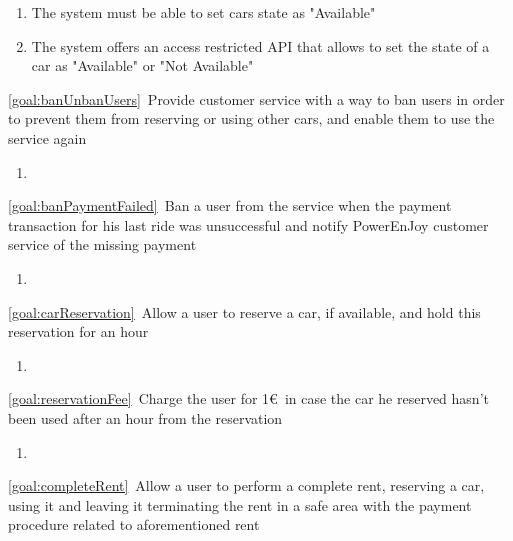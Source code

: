 \begin{description}
			\begin{enumerate}[label=\textbf{R\arabic*}]
   				\item The system must be able to set cars state as "Available"
   				\item The system offers an access restricted API that allows to set the state of a car as "Available" or
   				"Not Available"
  			\end{enumerate}
  		\item \ref{goal:banUnbanUsers}\ Provide customer service with a way to ban users in order to
  		prevent them from reserving or using other cars, and enable them to use the service again
  			\begin{enumerate}[label=\textbf{R\arabic*}]
  				\item
   			\end{enumerate}
  		\item \ref{goal:banPaymentFailed}\ Ban a user from the service when the payment transaction for his last ride
  		was unsuccessful and notify PowerEnJoy customer service of the missing payment
  			\begin{enumerate}[label=\textbf{R\arabic*}]
  				\item
  			\end{enumerate}
 	  	\item \ref{goal:carReservation}\ Allow a user to reserve a car, if available, and hold this reservation for an hour
 	  		\begin{enumerate}[label=\textbf{R\arabic*}]
 	  			\item
   			\end{enumerate}
  		\item \ref{goal:reservationFee}\ Charge the user for 1\euro\ in case the car he reserved hasn't been used after
  		an hour from the reservation
  			\begin{enumerate}[label=\textbf{R\arabic*}]
  				\item
   			\end{enumerate}
  		\item \ref{goal:completeRent}\ Allow a user to perform a complete rent, reserving a car, using it and leaving it
  		terminating the rent in a safe area with the payment procedure related to aforementioned rent 
  			\begin{enumerate}[label=\textbf{R\arabic*}]

\end{enumerate}
\end{description}
